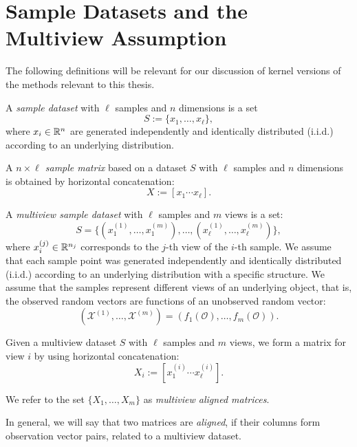 \section{Sample Datasets and the Multiview Assumption}
The following definitions will be relevant for our discussion of kernel versions of the methods relevant to this thesis.

\begin{definition}\label{def:notation:sample_dataset}
A \emph{sample dataset} with $\ell$ samples and $n$ dimensions is a set
$$ S := \lbrace x_1, \ldots, x_\ell \rbrace, $$
 where $x_i \in \mathbb{R}^n$ are  generated independently and identically distributed (i.i.d.) according to
an underlying distribution.
\end{definition}

\begin{definition}\label{def:notation:sample_matrix}
A \emph{$n\times\ell$ sample matrix} based on a dataset $S$ with $\ell$ samples and $n$ dimensions is obtained by horizontal concatenation:
$$ X := \left[ x_1 \cdots x_\ell \right]. $$
\end{definition}

\begin{definition}\label{def:notation:multiview_dataset}
A \emph{multiview sample dataset} with $\ell$ samples and $m$ views is a set:
$$ S = \big\{ \left( x_1^{(1)},\ldots, x_1^{(m)} \right), \ldots, \left( x_\ell^{(1)}, \ldots, x_\ell^{(m)} \right) \big\}, $$
where $x_i^{(j)} \in \mathbb{R}^{n_j}$ corresponds to the $j$-th view of the $i$-th sample.
We assume that each sample point was generated independently and identically distributed (i.i.d.)
according to an underlying distribution with a specific structure.
We assume that the samples represent different views of an underlying object, that is, the observed random vectors
are functions of an unobserved random vector:
  $$ \left( \mathcal{X}^{(1)}, \ldots, \mathcal{X}^{(m)} \right) = \left( f_1(\mathcal{O}), \ldots, f_m(\mathcal{O}) \right).$$
\end{definition}

\begin{definition}\label{def:notation:multiview_aligned_matrices}
Given a multiview dataset $S$ with $\ell$ samples and $m$ views,
we form a matrix for view $i$ by using horizontal concatenation:
$$ X_i := \left[ x_1^{(i)} \cdots x_\ell^{(i)} \right]. $$

We refer to the set $\{ X_1, \ldots, X_m \}$ as \emph{multiview aligned matrices}.

In general, we will say that two matrices are \emph{aligned}, if their columns form observation vector pairs, related to a multiview dataset.
\end{definition}

